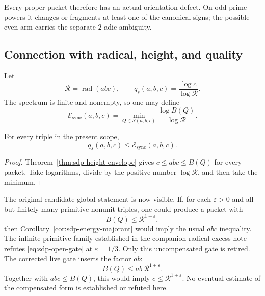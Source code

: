 Every proper packet therefore has an actual orientation defect.  On odd
prime powers it changes or fragments at least one of the canonical signs;
the possible even arm carries the separate $2$-adic ambiguity.

\subsection{Connection with radical, height, and quality}

Let
\[
 \mathcal R=\operatorname{rad}(abc),
 \qquad
 q_s(a,b,c)=\frac{\log c}{\log \mathcal R}.
\]
The spectrum is finite and nonempty, so one may define
\begin{equation}
 \mathcal E_{\mathrm{sync}}(a,b,c)
 =\min_{Q\in\mathcal S(a,b,c)}
 \frac{\log B(Q)}{\log \mathcal R}.
 \label{eq:sdp-energy}
\end{equation}

\begin{corollary}
\label{cor:sdp-energy-majorant}
For every triple in the present scope,
\[
 q_s(a,b,c)\le\mathcal E_{\mathrm{sync}}(a,b,c).
\]
\end{corollary}

\begin{proof}
Theorem~\ref{thm:sdp-height-envelope} gives $c\le abc\le B(Q)$ for every
packet.  Take logarithms, divide by the positive number $\log \mathcal R$,
and then
take the minimum.
\end{proof}

The original candidate global statement is now visible.  If, for each
$\varepsilon>0$ and all but finitely many primitive nonunit triples, one
could produce a packet with
\begin{equation}
 B(Q)\le \mathcal R^{1+\varepsilon},
 \label{eq:sdp-open-gate}
\end{equation}
then Corollary~\ref{cor:sdp-energy-majorant} would imply the usual
$abc$ inequality.  The infinite primitive family established in the
companion radical-excess note refutes
\eqref{eq:sdp-open-gate} at $\varepsilon=1/3$.  Only this uncompensated gate
is retired.  The corrected live gate inserts the factor $ab$:
\begin{equation}
 B(Q)\le ab\,\mathcal R^{1+\varepsilon}.
 \label{eq:sdp-compensated-open-gate}
\end{equation}
Together with $abc\le B(Q)$, this would imply
$c\le\mathcal R^{1+\varepsilon}$.  No eventual estimate of the compensated
form is established or refuted here.

